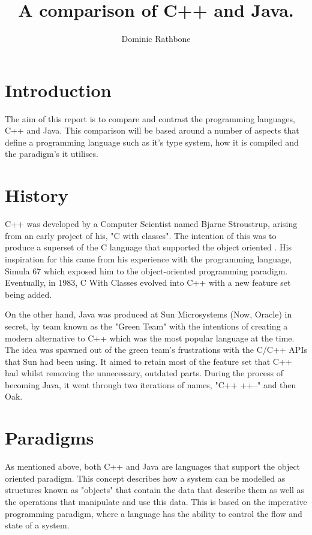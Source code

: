 \documentclass[]{report}
\title{A comparison of C++ and Java.}
\author{Dominic Rathbone}
\begin{document}
\maketitle
\section{Introduction}
The aim of this report is to compare and contrast the programming languages, C++ and Java. This comparison will be based around a number of aspects that define a programming language such as it's type system, how it is compiled and the paradigm's it utilises.

\section{History}
C++ was developed by a Computer Scientist named Bjarne Stroustrup, arising from an early project of his, "C with classes". The intention of this was to produce a superset of the C language that supported the object oriented . His inspiration for this came from his experience with the programming language, Simula 67 which exposed him to the object-oriented programming paradigm. Eventually, in 1983, C With Classes evolved into C++ with a new feature set being added. \cite{HistoryC++}

On the other hand, Java was produced at Sun Microsystems (Now, Oracle) in secret, by team known as the "Green Team" with the intentions of creating a modern alternative to C++ which was the most popular language at the time. The idea was spawned out of the green team's frustrations with the C/C++ APIs that Sun had been using. It aimed to retain most of the feature set that C++ had whilst removing the unnecessary, outdated parts. During the process of becoming Java, it went through two iterations of names, "C++ ++--" and then Oak.\cite{HistoryJava}

\section{Paradigms}
As mentioned above, both C++ and Java are languages that support the object oriented paradigm. This concept describes how a system can be modelled as structures known as "objects" that contain the data that describe them as well as the operations that manipulate and use this data. This is based on the imperative programming paradigm, where a language has the ability to control the flow and state of a system. \cite{Paradigms}
\end{document}
